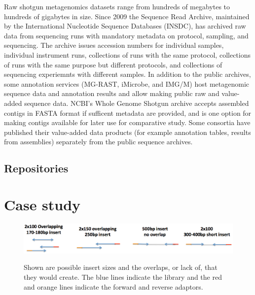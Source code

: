 \documentclass[graybox]{svmult}
\begin{document}
        Raw shotgun metagenomics datasets range from hundreds of megabytes to hundreds of gigabytes in size.  Since 2009 the Sequence Read Archive, maintained by the International Nucleotide Sequence Databases (INSDC), has archived raw data from sequencing runs with mandatory metadata on protocol, sampling, and sequencing.  The archive issues accession numbers for individual samples, individual instrument runs, collections of runs with the same protocol, collections of runs with the same purpose but different protocols, and collections of sequencing experiemnts with different samples.  
In addition to the public archives, some annotation services (MG-RAST, iMicrobe, and IMG/M) host metagenomic sequence data and annotation results and allow making public raw and value-added sequence data.    NCBI's Whole Genome Shotgun archive accepts assembled contigs in FASTA format if sufficent metadata are provided, and is one option for making contigs available for later use for comparative study.
Some consortia have published their value-added data products (for example annotation tables, results from assemblies) separately from the public sequence archives.

\subsection{Repositories}
\label{sec:5repos}

\section{Case study}
\label{sec:6}

%

\begin{figure}[t]
\caption{Shown are possible insert sizes and the overlaps, or lack of, that they would create. The blue lines indicate the library and the red and orange lines indicate the forward and reverse adaptors.}
\includegraphics[scale=.35]{imgs/image1.eps}
%
\label{fig:1}       %
\end{figure}
\end{document}
